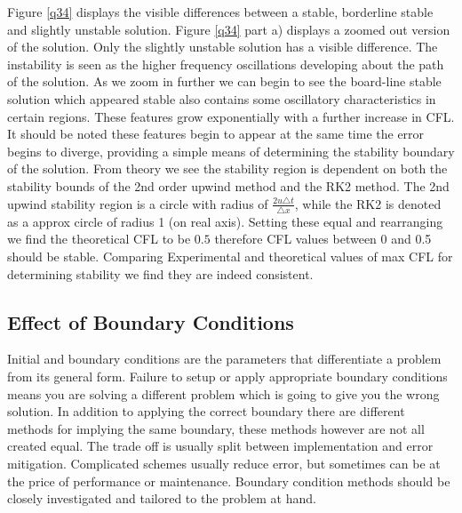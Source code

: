 \documentclass[paper=a4, fontsize=11pt, abstract=on]{scrartcl}
\numberwithin{equation}{section}		%
\numberwithin{figure}{section}			%
\numberwithin{table}{section}				%
\begin{document}
Figure \ref{q34} displays the visible differences between a stable, borderline stable and slightly unstable solution. Figure \ref{q34} part a) displays a zoomed out version of the solution. Only the slightly unstable solution has a visible difference. The instability is seen as the higher frequency oscillations developing about the path of the solution. As we zoom in further we can begin to see the board-line stable solution which appeared stable also contains some oscillatory characteristics in certain regions. These features grow exponentially with a further increase in CFL. It should be noted these features begin to appear at the same time the error begins to diverge, providing a simple means of determining the stability boundary of the solution. From theory we see the stability region is dependent on both the stability bounds of the 2nd order upwind method and the RK2 method. The 2nd upwind stability region is a circle with radius of $\frac{2u\triangle t}{\triangle x}$, while the RK2 is denoted as a approx circle of radius 1 (on real axis). Setting these equal and rearranging we find the theoretical CFL to be $0.5$ therefore CFL values between 0 and 0.5 should be stable. Comparing Experimental and theoretical values of max CFL for determining stability we find they are indeed consistent.

\subsection{Effect of Boundary Conditions}
Initial and boundary conditions are the parameters that differentiate a problem from its general form. Failure to setup or apply appropriate boundary conditions means you are solving a different problem which is going to give you the wrong solution. In addition to applying the correct boundary there are different methods for implying the same boundary, these methods however are not all created equal. The trade off is usually split between implementation and error mitigation. Complicated schemes usually reduce error, but sometimes can be at the price of performance or maintenance. Boundary condition methods should be closely investigated and tailored to the problem at hand. 
\end{document}
